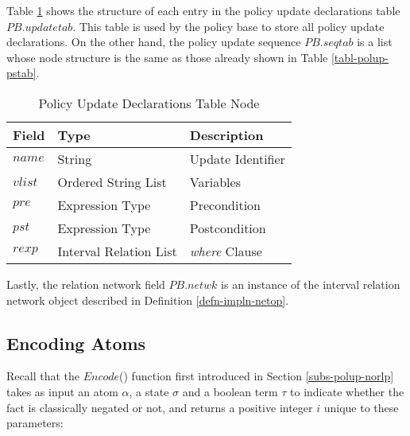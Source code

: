 \documentclass[11pt]{report}
\begin{document}
        Table \ref{tabl-impln-pdtab} shows the structure of each entry in the
        policy update declarations table $PB$.$updatetab$. This table is used
        by the policy base to store all policy update declarations. On the
        other hand, the policy update sequence $PB$.$seqtab$ is a list whose
        node structure is the same as those already shown in Table
        \ref{tabl-polup-pstab}.

        \begin{table}[tbhp]
          \begin{center}
            \begin{tabular}[t]{|l|l|l|}
              \hline
              \textbf{Field} & \textbf{Type}          & \textbf{Description} \\
              \hline
              $name$         & String                 & Update Identifier \\
              \hline                                  
              $vlist$        & Ordered String List    & Variables \\
              \hline                                  
              $pre$          & Expression Type        & Precondition \\
              \hline                                  
              $pst$          & Expression Type        & Postcondition \\
              \hline
              $rexp$         & Interval Relation List & {\em where} Clause \\
              \hline
            \end{tabular}
          \end{center}
          \caption{Policy Update Declarations Table Node}
          \label{tabl-impln-pdtab}
        \end{table}

        Lastly, the relation network field $PB$.$netwk$ is an instance of the
        interval relation network object described in Definition
        \ref{defn-impln-netop}.

      \subsection{Encoding Atoms}
        \label{subs-impln-encod}

        Recall that the $Encode$() function first introduced in Section
        \ref{subs-polup-norlp} takes as input an atom $\alpha$, a state
        $\sigma$ and a boolean term $\tau$ to indicate whether the fact is
        classically negated or not, and returns a positive integer $i$
        unique to these parameters:
\end{document}
